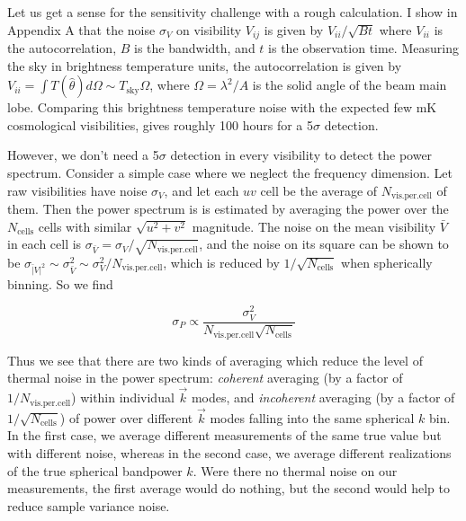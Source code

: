 Let us get a sense for the sensitivity challenge with a rough calculation. I show in Appendix A that the noise $\sigma_V$ on visibility $V_{ij}$ is given by $V_{ii}/\sqrt{Bt}$ where $V_{ii}$ is the autocorrelation, $B$ is the bandwidth, and $t$ is the observation time. Measuring the sky in brightness temperature units, the autocorrelation is given by $V_{ii}=\int T(\hat\theta)d\Omega\sim T_\text{sky}\Omega$, where $\Omega=\lambda^2/A$ is the solid angle of the beam main lobe. Comparing this brightness temperature noise with the expected few mK cosmological visibilities, gives roughly 100 hours for a 5$\sigma$ detection. 

However, we don't need a 5$\sigma$ detection in every visibility to detect the power spectrum. Consider a simple case where we neglect the frequency dimension. Let raw visibilities have noise $\sigma_V$, and let each $uv$ cell be the average of $N_\text{vis.per.cell}$ of them. Then the power spectrum is is estimated by averaging the power over the $N_\text{cells}$ cells with similar $\sqrt{u^2+v^2}$ magnitude. The noise on the mean visibility $\bar{V}$ in each cell is $\sigma_{\bar V}=\sigma_V/\sqrt{N_\text{vis.per.cell}}$, and the noise on its square can be shown to be $\sigma_{\bar |V|^2}\sim\sigma_{\bar V}^2\sim\sigma_V^2/N_\text{vis.per.cell}$, which is reduced by $1/\sqrt{N_\text{cells}}$ when spherically binning. So we find 

\begin{equation}
	\sigma_P\propto\frac{\sigma_V^2}{N_\text{vis.per.cell}\sqrt{N_\text{cells}}}
\end{equation}

Thus we see that there are two kinds of averaging which reduce the level of thermal noise in the power spectrum: \textit{coherent} averaging (by a factor of $1/N_\text{vis.per.cell}$) within individual $\vec{k}$ modes, and \textit{incoherent} averaging (by a factor of $1/\sqrt{N_\text{cells}}$) of power over different $\vec{k}$ modes falling into the same spherical $k$ bin. In the first case, we average different measurements of the same true value but with different noise, whereas in the second case, we average different realizations of the true spherical bandpower $k$. Were there no thermal noise on our measurements, the first average would do nothing, but the second would help to reduce sample variance noise. 


